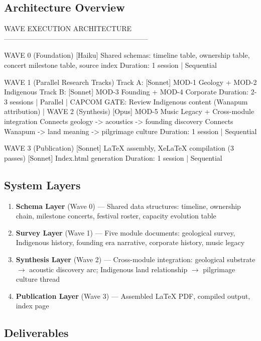 \documentclass[11pt,letterpaper]{article}
\begin{document}
\subsection{Architecture Overview}

\begin{asciibox}
WAVE EXECUTION ARCHITECTURE
--------------------------------------------------------------

WAVE 0 (Foundation)
  [Haiku] Shared schemas: timeline table, ownership table,
  concert milestone table, source index
  Duration: 1 session | Sequential

WAVE 1 (Parallel Research Tracks)
  Track A: [Sonnet] MOD-1 Geology + MOD-2 Indigenous
  Track B: [Sonnet] MOD-3 Founding + MOD-4 Corporate
  Duration: 2-3 sessions | Parallel
        |
   CAPCOM GATE: Review Indigenous content (Wanapum attribution)
        |
WAVE 2 (Synthesis)
  [Opus] MOD-5 Music Legacy + Cross-module integration
  Connects geology -> acoustics -> founding discovery
  Connects Wanapum -> land meaning -> pilgrimage culture
  Duration: 1 session | Sequential

WAVE 3 (Publication)
  [Sonnet] LaTeX assembly, XeLaTeX compilation (3 passes)
  [Sonnet] Index.html generation
  Duration: 1 session | Sequential
\end{asciibox}

\subsection{System Layers}

\begin{enumerate}[noitemsep]
  \item \textbf{Schema Layer} (Wave 0) --- Shared data structures: timeline, ownership chain, milestone concerts, festival roster, capacity evolution table
  \item \textbf{Survey Layer} (Wave 1) --- Five module documents: geological survey, Indigenous history, founding era narrative, corporate history, music legacy
  \item \textbf{Synthesis Layer} (Wave 2) --- Cross-module integration: geological substrate $\rightarrow$ acoustic discovery arc; Indigenous land relationship $\rightarrow$ pilgrimage culture thread
  \item \textbf{Publication Layer} (Wave 3) --- Assembled LaTeX PDF, compiled output, index page
\end{enumerate}

\subsection{Deliverables}
\end{document}
